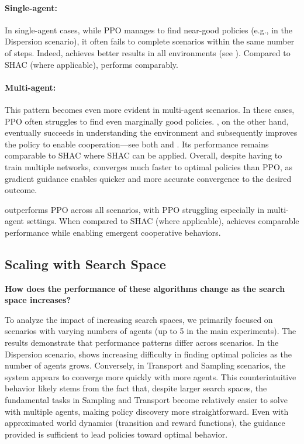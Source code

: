 \noindent\paragraph{Single-agent:} In single-agent cases, while PPO manages to find near-good policies (e.g., in the Dispersion scenario), it often fails to complete scenarios within the same number of steps. Indeed, \fname{} achieves better results in all environments (see ). Compared to SHAC (where applicable), \fname{} performs comparably.

\noindent\paragraph{Multi-agent:} This pattern becomes even more evident in multi-agent scenarios. In these cases, PPO often struggles to find even marginally good policies. \fname{}, on the other hand, eventually succeeds in understanding the environment and subsequently improves the policy to enable cooperation---see both  and . Its performance remains comparable to SHAC where SHAC can be applied.
Overall, despite having to train multiple networks, \fname{} converges much faster to optimal policies than PPO, as gradient guidance enables quicker and more accurate convergence to the desired outcome.

\begin{replybox}
\fname{} outperforms PPO across all scenarios, with PPO struggling especially in multi-agent settings. When compared to SHAC (where applicable), \fname{} achieves comparable performance while enabling emergent cooperative behaviors.
\end{replybox}

\subsection{Scaling with Search Space}
\begin{rqbox}
\textbf{How does the performance of these algorithms change as the search space increases?}
\end{rqbox}

To analyze the impact of increasing search spaces, we primarily focused on scenarios with varying numbers of agents (up to 5 in the main experiments). The results demonstrate that performance patterns differ across scenarios. In the Dispersion scenario, \fname{} shows increasing difficulty in finding optimal policies as the number of agents grows. Conversely, in Transport and Sampling scenarios, the system appears to converge more quickly with more agents. This counterintuitive behavior likely stems from the fact that, despite larger search spaces, the fundamental tasks in Sampling and Transport become relatively easier to solve with multiple agents, making policy discovery more straightforward. Even with approximated world dynamics (transition and reward functions), the guidance provided is sufficient to lead policies toward optimal behavior.

